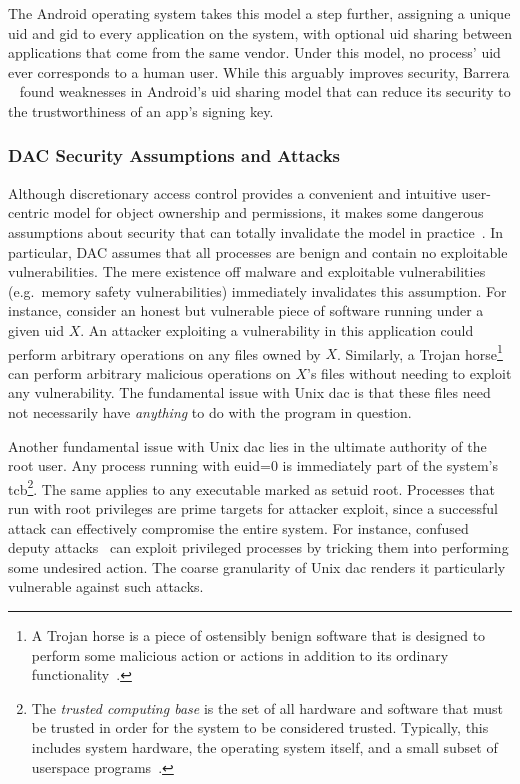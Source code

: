 The Android operating system takes this model a step further, assigning a unique \gls{uid}
and \gls{gid} to every application on the system, with optional \gls{uid} sharing between
applications that come from the same vendor. Under this model, no process' \gls{uid} ever
corresponds to a human user. While this arguably improves security, Barrera
\etal~\cite{barrera2012_android} found weaknesses in Android's \gls{uid} sharing model
that can reduce its security to the trustworthiness of an app's signing key.

\subsubsection*{DAC Security Assumptions and Attacks}

Although discretionary access control provides a convenient and intuitive user-centric
model for object ownership and permissions, it makes some dangerous assumptions about
security that can totally invalidate the model in
practice~\cite{shu2016_security_isolation_study}. In particular, DAC assumes that all
processes are benign and contain no exploitable vulnerabilities. The mere existence off
malware and exploitable vulnerabilities (e.g.~memory safety vulnerabilities) immediately
invalidates this assumption. For instance, consider an honest but vulnerable piece of
software running under a given \gls{uid} $X$. An attacker exploiting a vulnerability in
this application could perform arbitrary operations on any files owned by $X$. Similarly,
a Trojan horse\footnote{A Trojan horse is a piece of ostensibly benign software that
is designed to perform some malicious action or actions in addition to its ordinary
functionality~\cite{van_oorschot2020_tools_jewels}.}~\cite{shu2016_security_isolation_study,
van_oorschot2020_tools_jewels} can perform arbitrary malicious operations on $X$'s files
without needing to exploit any vulnerability. The fundamental issue with Unix \gls{dac} is
that these files need not necessarily have \textit{anything} to do with the program in
question.

Another fundamental issue with Unix \gls{dac} lies in the ultimate authority of the root
user. Any process running with \gls{euid}=0 is immediately part of the system's
\gls{tcb}\footnote{The \textit{trusted computing base} is the set of all hardware
and software that must be trusted in order for the system to be considered trusted.
Typically, this includes system hardware, the operating system itself, and a small subset
of userspace programs~\cite{jaeger2008_os_security}.}. The same applies to any executable
marked as setuid root. Processes that run with root privileges are prime targets for
attacker exploit, since a successful attack can effectively compromise the entire system.
For instance, confused deputy attacks~\cite{hardy1988_confused_deputy,
shu2016_security_isolation_study} can exploit privileged processes by tricking them into
performing some undesired action. The coarse granularity of Unix \gls{dac} renders it
particularly vulnerable against such attacks.

